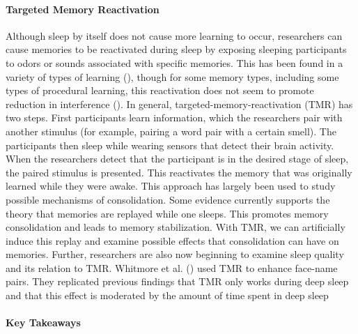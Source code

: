 \documentclass[
]{krantz}
\begin{document}
\paragraph*{Targeted Memory Reactivation}\label{targeted-memory-reactivation}

Although sleep by itself does not cause more learning to occur, researchers can cause memories to be reactivated during sleep by exposing sleeping participants to odors or sounds associated with specific memories. This has been found in a variety of types of learning (), though for some memory types, including some types of procedural learning, this reactivation does not seem to promote reduction in interference (). In general, targeted-memory-reactivation (TMR) has two steps. First participants learn information, which the researchers pair with another stimulus (for example, pairing a word pair with a certain smell). The participants then sleep while wearing sensors that detect their brain activity. When the researchers detect that the participant is in the desired stage of sleep, the paired stimulus is presented. This reactivates the memory that was originally learned while they were awake. This approach has largely been used to study possible mechanisms of consolidation. Some evidence currently supports the theory that memories are replayed while one sleeps. This promotes memory consolidation and leads to memory stabilization. With TMR, we can artificially induce this replay and examine possible effects that consolidation can have on memories. Further, researchers are also now beginning to examine sleep quality and its relation to TMR. Whitmore et al. () used TMR to enhance face-name pairs. They replicated previous findings that TMR only works during deep sleep and that this effect is moderated by the amount of time spent in deep sleep

\paragraph*{Key Takeaways}\label{key-takeaways-4}
\end{document}
